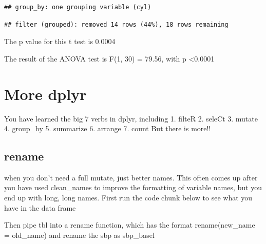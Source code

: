 \documentclass[
]{book}
\newenvironment{Shaded}{\begin{snugshade}}{\end{snugshade}}
\newcommand{\DataTypeTok}[1]{\textcolor[rgb]{0.13,0.29,0.53}{#1}}
\newcommand{\DecValTok}[1]{\textcolor[rgb]{0.00,0.00,0.81}{#1}}
\newcommand{\KeywordTok}[1]{\textcolor[rgb]{0.13,0.29,0.53}{\textbf{#1}}}
\newcommand{\NormalTok}[1]{#1}
\newcommand{\OperatorTok}[1]{\textcolor[rgb]{0.81,0.36,0.00}{\textbf{#1}}}
\newcommand{\StringTok}[1]{\textcolor[rgb]{0.31,0.60,0.02}{#1}}
\begin{document}
\begin{verbatim}
## group_by: one grouping variable (cyl)
\end{verbatim}

\begin{verbatim}
## filter (grouped): removed 14 rows (44%), 18 rows remaining
\end{verbatim}

The p value for this t test is 0.0004

\begin{Shaded}
\end{Shaded}

The result of the ANOVA test is F(1, 30) = 79.56, with p \textless0.0001

\hypertarget{more-dplyr}{%
\section{More dplyr}\label{more-dplyr}}

You have learned the big 7 verbs in dplyr, including
1. filteR
2. seleCt
3. mutate
4. group\_by
5. summarize
6. arrange
7. count
But there is more!!

\hypertarget{rename}{%
\subsection{rename}\label{rename}}

when you don't need a full mutate, just better names.
This often comes up after you have used clean\_names to improve the formatting of variable names, but you end up with long, long names.
First run the code chunk below to see what you have in the data frame

Then pipe tbl into a rename function, which has the format
rename(new\_name = old\_name)
and rename the sbp as sbp\_basel

\begin{Shaded}
\end{Shaded}
\end{document}
